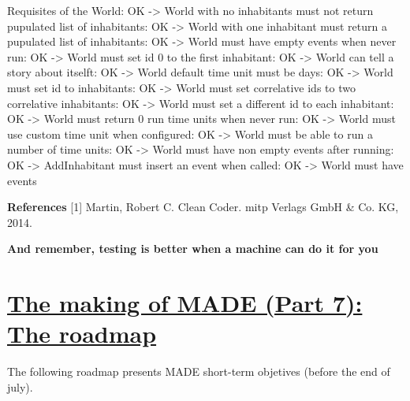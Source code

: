 \documentclass[a4paper]{article}
\newcommand\textstyleStrongEmphasis[1]{\textbf{#1}}
\begin{document}
Requisites of the World: OK -{\textgreater} World with no inhabitants must not return
pupulated list of inhabitants: OK -{\textgreater} World with one inhabitant must return a pupulated
list of inhabitants: OK -{\textgreater} World must have empty events when never
run: OK -{\textgreater} World must set id 0 to the first
inhabitant: OK -{\textgreater} World can tell a story about itselft: OK -{\textgreater} World default time unit must be days: OK -{\textgreater} World must set id to inhabitants: OK -{\textgreater} World must set correlative ids to two correlative
inhabitants: OK -{\textgreater} World must set a different id to each
inhabitant: OK -{\textgreater} World must return 0 run time units when never
run: OK -{\textgreater} World must use custom time unit when
configured: OK -{\textgreater} World must be able to run a number of time
units: OK -{\textgreater} World must have non empty events after
running: OK -{\textgreater} AddInhabitant must insert an event when
called: OK -{\textgreater} World must have events

\textstyleStrongEmphasis{References\newline
}[1] Martin, Robert C. Clean Coder. mitp Verlags GmbH \& Co. KG, 2014.

\textstyleStrongEmphasis{And remember, testing is better when a machine
can do it for you}



\bigskip

\clearpage\section[The making of MADE (Part 7): The
roadmap]{\href{http://www.velonuboso.com/made/2015/06/27/making-part-7-roadmap/}{The
making of MADE (Part 7): The roadmap}}
The following roadmap presents MADE short-term objetives (before the end
of july).
\end{document}
